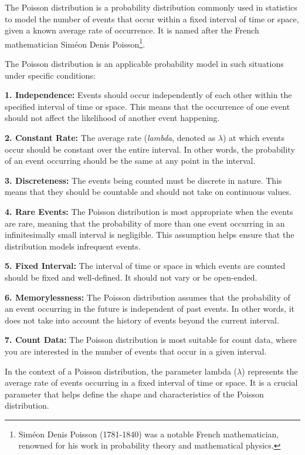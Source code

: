 \documentclass[
  a4paper,
]{scrbook}
\begin{document}
The Poisson distribution is a probability distribution commonly used in
statistics to model the number of events that occur within a fixed
interval of time or space, given a known average rate of occurrence. It
is named after the French mathematician Siméon Denis Poisson\footnote{Siméon
  Denis Poisson (1781-1840) was a notable French mathematician, renowned
  for his work in probability theory and mathematical physics.}.

The Poisson distribution is an applicable probability model in such
situations under specific conditions:

\textbf{1. Independence:} Events should occur independently of each
other within the specified interval of time or space. This means that
the occurrence of one event should not affect the likelihood of another
event happening.

\textbf{2. Constant Rate:} The average rate (\emph{lambda}, denoted as
\(\lambda\)) at which events occur should be constant over the entire
interval. In other words, the probability of an event occurring should
be the same at any point in the interval.

\textbf{3. Discreteness:} The events being counted must be discrete in
nature. This means that they should be countable and should not take on
continuous values.

\textbf{4. Rare Events:} The Poisson distribution is most appropriate
when the events are rare, meaning that the probability of more than one
event occurring in an infinitesimally small interval is negligible. This
assumption helps ensure that the distribution models infrequent events.

\textbf{5. Fixed Interval:} The interval of time or space in which
events are counted should be fixed and well-defined. It should not vary
or be open-ended.

\textbf{6. Memorylessness:} The Poisson distribution assumes that the
probability of an event occurring in the future is independent of past
events. In other words, it does not take into account the history of
events beyond the current interval.

\textbf{7. Count Data:} The Poisson distribution is most suitable for
count data, where you are interested in the number of events that occur
in a given interval.

In the context of a Poisson distribution, the parameter lambda
(\(\lambda\)) represents the average rate of events occurring in a fixed
interval of time or space. It is a crucial parameter that helps define
the shape and characteristics of the Poisson distribution.
\end{document}
